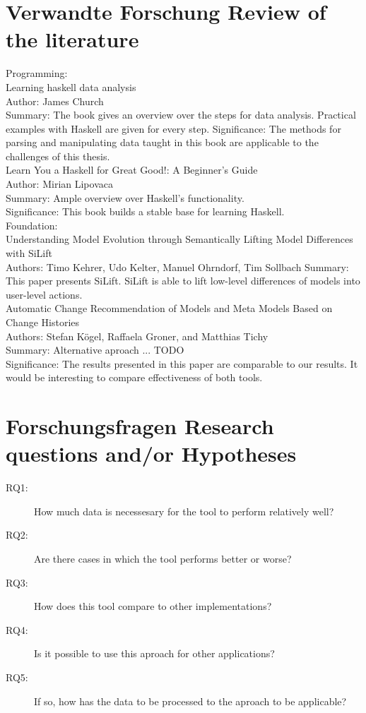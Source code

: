 \documentclass[10pt,a4paper,oneside]{scrartcl}
\begin{document}
	\section{
		{Verwandte Forschung}
		{Review of the literature}}
	
	Programming:\\
	Learning haskell data analysis\\
	Author: James Church\\
	Summary: The book gives an overview over the steps for data analysis. Practical examples with Haskell are given for every step.
	Significance: The methods for parsing and manipulating data taught in this book are applicable to the challenges of this thesis.\\
	
	
	Learn You a Haskell for Great Good!: A Beginner's Guide\\
	Author: Mirian Lipovaca\\
	Summary: Ample overview over Haskell's functionality.\\
	Significance: This book builds a stable base for learning Haskell.\\
	
	
	Foundation:\\
	Understanding Model Evolution through Semantically Lifting Model Differences with SiLift\\
	Authors: Timo Kehrer, Udo Kelter, Manuel Ohrndorf, Tim Sollbach
	Summary: This paper presents SiLift. SiLift is able to lift low-level differences of models into user-level actions.\\
	
	
	Automatic Change Recommendation of Models and Meta Models Based on Change Histories\\
	Authors: Stefan Kögel, Raffaela Groner, and Matthias Tichy\\
	Summary: Alternative aproach ... TODO\\
	Significance: The results presented in this paper are comparable to our results. It would be interesting to compare effectiveness of both tools.\\
	
	\section{
		{Forschungsfragen}
		{Research questions and/or Hypotheses}}
	\label{sub:questions}
	
	\begin{description}
		\item[RQ1:] How much data is necessesary for the tool to perform relatively well?
		\item[RQ2:] Are there cases in which the tool performs better or worse?
		\item[RQ3:] How does this tool compare to other implementations?
		\item[RQ4:] Is it possible to use this aproach for other applications?
		\item[RQ5:] If so, how has the data to be processed to the aproach to be applicable?
	\end{description}
	
\end{document}
